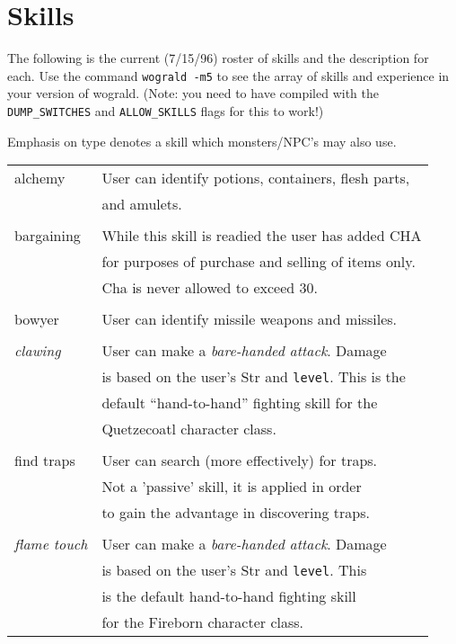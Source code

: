 \chapter{Skills}
\label{app:skills}

The following is the current (7/15/96) roster of skills and the
description for each. Use the command {\tt wograld -m5} to see the array
of skills and experience in your version of wograld.
(Note: you need to have compiled with the {\tt DUMP\_SWITCHES} and
{\tt ALLOW\_SKILLS} flags for this to work!)
 
Emphasis on type denotes a skill which monsters/NPC's may also use.
 
\begin{longtable}{|p{4cm}|p{9cm}|} \hline
alchemy &  User can identify potions, containers, flesh parts, \\ 
	&  and amulets. \\ 
 &  \\
bargaining   	& While this skill is readied the user has added CHA \\ 
	 	& for purposes of purchase and selling of items only. \\ 
		& Cha is never allowed to exceed 30. \\ 
 &  \\
bowyer  &  User can identify missile weapons and missiles. \\ 
 &  \\
{\em clawing}	& User can make a {\em bare-handed attack}. Damage \\ 
                & is based on the user's Str and {\tt level}. This is the \\ 
		& default ``hand-to-hand'' fighting skill for the  \\
		& Quetzecoatl character class. \\
 &  \\
find traps	& User can search (more effectively) for traps. \\ 
		& Not a 'passive' skill, it is applied in order \\ 
		& to gain the advantage in discovering traps. \\ 
 &  \\
{\em flame touch} & User can make a {\em bare-handed attack}. Damage \\ 
		& is based on the user's Str and {\tt level}. This \\ 
		& is the default hand-to-hand fighting skill \\ 
		& for the Fireborn character class. \\ 

\end{longtable}
